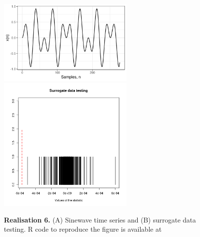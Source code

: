 \documentclass[11pt]{article}
\newcommand{\R}{\textsf{R}\xspace}
\newcommand{\codeicon}{{\color{linkcolor}\faFileCodeO}}
\newcommand{\codelink}[1]{\href{#1}{\codeicon}}
\begin{document}
\begin{figure}
\centering
\includegraphics[width=0.6\textwidth]{r6_ts_sinewaves_window_length_278} %
\includegraphics[width=0.6\textwidth]{r6_sdt_sinewaves_window_length_278} %
    \caption[]{
	{\bf Realisation 6.}
	(A) Sinewave time series and (B) surrogate data testing.
	\R code to reproduce the figure is available at 
	\codelink{https://github.com/mxochicale-phd/thesis/blob/master/0_code_data/1_code/x_surrogate/00_timeseries/code/B_.R}
	}
    \label{fig:thesis-outline}
\end{figure}
\end{document}
